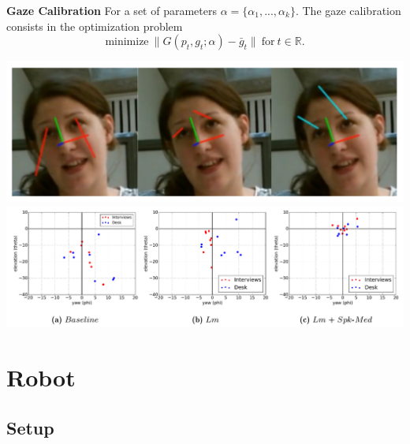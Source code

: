 \documentclass{beamer}
\begin{document}
\begin{frame}
\textbf{Gaze Calibration} \newline
For a set of parameters $\alpha= \{\alpha_1,..., \alpha_k \}$. The gaze calibration consists in the optimization problem
\begin{equation}
\text{minimize}~ \|G(p_t,g_t; \alpha) - \bar{g}_t \| ~ \text{for} ~ t \in \mathbb{R}.
\end{equation}
\begin{center}
\includegraphics[scale=0.4]{Pictures/GazeCalibration.png} \\
\includegraphics[scale=0.25]{Pictures/GazeCalibrationGraph.png} 
\end{center}
\end{frame}

\section{Robot}

\subsection{Setup}
\end{document}
